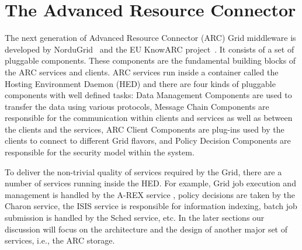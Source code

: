 \documentclass[final]{ieee}
\begin{document}






\section{The Advanced Resource Connector}
\label{The Advance Resource Connector}

The next generation of Advanced Resource Connector (ARC) Grid middleware is
developed by NorduGrid~\cite{NorduGridsite} and the EU KnowARC
 project~\cite{KnowARCsite}. It consists of a set of pluggable 
components. These components are the
fundamental building blocks of the ARC services and clients. ARC
services run inside a container called the Hosting Environment
Daemon (HED) and there are four kinds of pluggable components with well
defined tasks: Data Management Components are used to transfer the
data using various protocols, Message Chain Components are
responsible for the communication within clients and services as well as
between the clients and the services, ARC Client Components are
plug-ins used by the clients to connect to different Grid flavors, and
Policy Decision Components are responsible for the security model
within the system.

To deliver the non-trivial quality of services required by the Grid,
there are a number of services running inside the HED. For example, Grid
job execution and management is handled by the A-REX service 
\cite{AREXdesigndoc}, policy
decisions are taken by the Charon service, the ISIS service is
responsible for information indexing, batch job submission is
handled by the Sched service, etc. In the later sections our discussion
will focus on the architecture and the design of another major set
of services, i.e., the ARC storage. 
\end{document}
